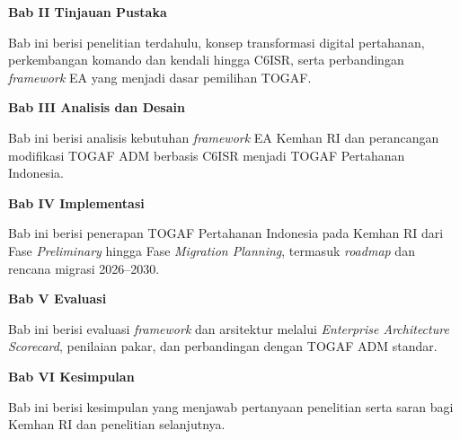 \textbf{Bab II Tinjauan Pustaka}

Bab ini berisi penelitian terdahulu, konsep transformasi digital pertahanan, perkembangan komando dan kendali hingga C6ISR, serta perbandingan \textit{framework} EA yang menjadi dasar pemilihan TOGAF.

\textbf{Bab III Analisis dan Desain}

Bab ini berisi analisis kebutuhan \textit{framework} EA Kemhan RI dan perancangan modifikasi TOGAF ADM berbasis C6ISR menjadi TOGAF Pertahanan Indonesia.

\textbf{Bab IV Implementasi}

Bab ini berisi penerapan TOGAF Pertahanan Indonesia pada Kemhan RI dari Fase \textit{Preliminary} hingga Fase \textit{Migration Planning}, termasuk \textit{roadmap} dan rencana migrasi 2026–2030.

\textbf{Bab V Evaluasi}

Bab ini berisi evaluasi \textit{framework} dan arsitektur melalui \textit{Enterprise Architecture Scorecard}, penilaian pakar, dan perbandingan dengan TOGAF ADM standar.

\textbf{Bab VI Kesimpulan}

Bab ini berisi kesimpulan yang menjawab pertanyaan penelitian serta saran bagi Kemhan RI dan penelitian selanjutnya.
